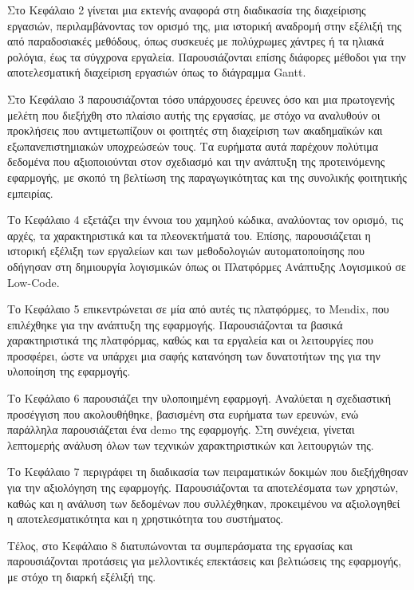 		Στο Κεφάλαιο 2 γίνεται μια εκτενής αναφορά στη διαδικασία της διαχείρισης εργασιών, περιλαμβάνοντας τον ορισμό της, μια ιστορική αναδρομή στην εξέλιξή της από παραδοσιακές μεθόδους, όπως συσκευές με πολύχρωμες χάντρες ή τα ηλιακά ρολόγια, έως τα σύγχρονα εργαλεία. Παρουσιάζονται επίσης διάφορες μέθοδοι για την αποτελεσματική διαχείριση εργασιών όπως το διάγραμμα Gantt.

		Στο Κεφάλαιο 3 παρουσιάζονται τόσο υπάρχουσες έρευνες όσο και μια πρωτογενής μελέτη που διεξήχθη στο πλαίσιο αυτής της εργασίας, με στόχο να αναλυθούν οι προκλήσεις που αντιμετωπίζουν οι φοιτητές στη διαχείριση των ακαδημαϊκών και εξωπανεπιστημιακών υποχρεώσεών τους. Τα ευρήματα αυτά παρέχουν πολύτιμα δεδομένα που αξιοποιούνται στον σχεδιασμό και την ανάπτυξη της προτεινόμενης εφαρμογής, με σκοπό τη βελτίωση της παραγωγικότητας και της συνολικής φοιτητικής εμπειρίας.

		Το Κεφάλαιο 4 εξετάζει την έννοια του χαμηλού κώδικα, αναλύοντας τον ορισμό, τις αρχές, τα χαρακτηριστικά και τα πλεονεκτήματά του. Επίσης, παρουσιάζεται η ιστορική εξέλιξη των εργαλείων και των μεθοδολογιών αυτοματοποίησης που οδήγησαν στη δημιουργία λογισμικών όπως οι Πλατφόρμες Ανάπτυξης Λογισμικού σε Low-Code.

		Το Κεφάλαιο 5 επικεντρώνεται σε μία από αυτές τις πλατφόρμες, το Mendix, που επιλέχθηκε για την ανάπτυξη της εφαρμογής. Παρουσιάζονται τα βασικά χαρακτηριστικά της πλατφόρμας, καθώς και τα εργαλεία και οι λειτουργίες που προσφέρει, ώστε να υπάρχει μια σαφής κατανόηση των δυνατοτήτων της για την υλοποίηση της εφαρμογής.

		Το Κεφάλαιο 6 παρουσιάζει την υλοποιημένη εφαρμογή. Αναλύεται η σχεδιαστική προσέγγιση που ακολουθήθηκε, βασισμένη στα ευρήματα των ερευνών, ενώ παράλληλα παρουσιάζεται ένα demo της εφαρμογής. Στη συνέχεια, γίνεται λεπτομερής ανάλυση όλων των τεχνικών χαρακτηριστικών και λειτουργιών της.

		Το Κεφάλαιο 7 περιγράφει τη διαδικασία των πειραματικών δοκιμών που διεξήχθησαν για την αξιολόγηση της εφαρμογής. Παρουσιάζονται τα αποτελέσματα των χρηστών, καθώς και η ανάλυση των δεδομένων που συλλέχθηκαν, προκειμένου να αξιολογηθεί η αποτελεσματικότητα και η χρηστικότητα του συστήματος.

		Τέλος, στο Κεφάλαιο 8 διατυπώνονται τα συμπεράσματα της εργασίας και παρουσιάζονται προτάσεις για μελλοντικές επεκτάσεις και βελτιώσεις της εφαρμογής, με στόχο τη διαρκή εξέλιξή της.
